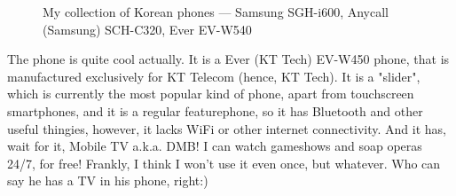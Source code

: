 \begin{post}
\begin{content}
\begin{figure}
\centering{}
\caption{My collection of Korean phones --- Samsung SGH-i600, Anycall (Samsung) SCH-C320, Ever EV-W540}
\end{figure}The phone is quite cool actually. It is a Ever (KT Tech) EV-W450 phone, that is manufactured exclusively for KT Telecom (hence, KT Tech). It is a "slider", which is currently the most popular kind of phone, apart from touchscreen smartphones, and it is a regular featurephone, so it has Bluetooth and other useful thingies, however, it lacks WiFi or other internet connectivity. And it has, wait for it, Mobile TV a.k.a. DMB! I can watch gameshows and soap operas 24/7, for free! Frankly, I think I won't use it even once, but whatever. Who can say he has a TV in his phone, right:)
	\end{content}
\end{post}
